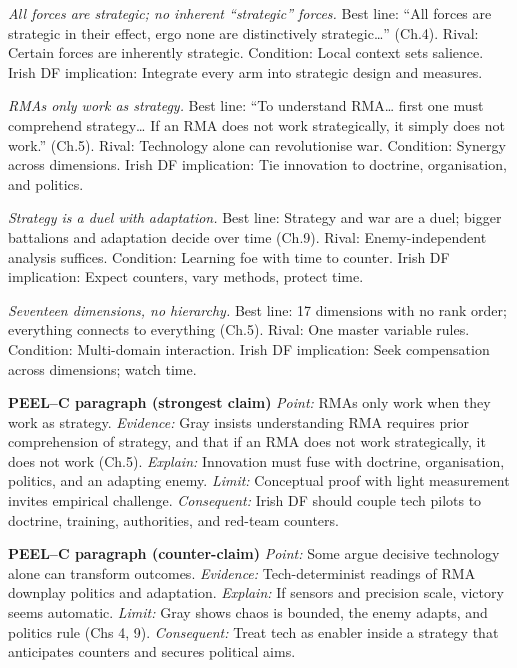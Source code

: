 \textit{All forces are strategic; no inherent “strategic” forces.} Best line: “All forces are strategic in their effect, ergo none are distinctively strategic…” (Ch.4). Rival: Certain forces are inherently strategic. Condition: Local context sets salience. Irish DF implication: Integrate every arm into strategic design and measures.

\textit{RMAs only work as strategy.} Best line: “To understand RMA… first one must comprehend strategy… If an RMA does not work strategically, it simply does not work.” (Ch.5). Rival: Technology alone can revolutionise war. Condition: Synergy across dimensions. Irish DF implication: Tie innovation to doctrine, organisation, and politics.

\textit{Strategy is a duel with adaptation.} Best line: Strategy and war are a duel; bigger battalions and adaptation decide over time (Ch.9). Rival: Enemy-independent analysis suffices. Condition: Learning foe with time to counter. Irish DF implication: Expect counters, vary methods, protect time.

\textit{Seventeen dimensions, no hierarchy.} Best line: 17 dimensions with no rank order; everything connects to everything (Ch.5). Rival: One master variable rules. Condition: Multi-domain interaction. Irish DF implication: Seek compensation across dimensions; watch time.

\textbf{PEEL–C paragraph (strongest claim)}
\textit{Point:} RMAs only work when they work as strategy.
\textit{Evidence:} Gray insists understanding RMA requires prior comprehension of strategy, and that if an RMA does not work strategically, it does not work (Ch.5).
\textit{Explain:} Innovation must fuse with doctrine, organisation, politics, and an adapting enemy.
\textit{Limit:} Conceptual proof with light measurement invites empirical challenge.
\textit{Consequent:} Irish DF should couple tech pilots to doctrine, training, authorities, and red-team counters.

\textbf{PEEL–C paragraph (counter-claim)}
\textit{Point:} Some argue decisive technology alone can transform outcomes.
\textit{Evidence:} Tech-determinist readings of RMA downplay politics and adaptation.
\textit{Explain:} If sensors and precision scale, victory seems automatic.
\textit{Limit:} Gray shows chaos is bounded, the enemy adapts, and politics rule (Chs 4, 9).
\textit{Consequent:} Treat tech as enabler inside a strategy that anticipates counters and secures political aims.

